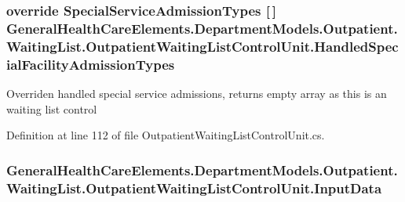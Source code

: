 \subsubsection[{\texorpdfstring{Handled\+Special\+Facility\+Admission\+Types}{HandledSpecialFacilityAdmissionTypes}}]{\setlength{\rightskip}{0pt plus 5cm}override {\bf Special\+Service\+Admission\+Types} \mbox{[}$\,$\mbox{]} General\+Health\+Care\+Elements.\+Department\+Models.\+Outpatient.\+Waiting\+List.\+Outpatient\+Waiting\+List\+Control\+Unit.\+Handled\+Special\+Facility\+Admission\+Types\hspace{0.3cm}{\ttfamily [get]}}\hypertarget{class_general_health_care_elements_1_1_department_models_1_1_outpatient_1_1_waiting_list_1_1_out0eb5e03b9183fdbdabb1cbe4530cecf4_a5f6e751d4a6b6ecb2c62f367be0c5e86}{}\label{class_general_health_care_elements_1_1_department_models_1_1_outpatient_1_1_waiting_list_1_1_out0eb5e03b9183fdbdabb1cbe4530cecf4_a5f6e751d4a6b6ecb2c62f367be0c5e86}


Overriden handled special service admissions, returns empty array as this is an waiting list control 



Definition at line 112 of file Outpatient\+Waiting\+List\+Control\+Unit.\+cs.

\subsubsection[{\texorpdfstring{Input\+Data}{InputData}}]{ General\+Health\+Care\+Elements.\+Department\+Models.\+Outpatient.\+Waiting\+List.\+Outpatient\+Waiting\+List\+Control\+Unit.\+Input\+Data\hspace{0.3cm}{\ttfamily [get]}}\hypertarget{class_general_health_care_elements_1_1_department_models_1_1_outpatient_1_1_waiting_list_1_1_out0eb5e03b9183fdbdabb1cbe4530cecf4_a070eecfc1d919b62fb8ad02bd18fb23c}{}\label{class_general_health_care_elements_1_1_department_models_1_1_outpatient_1_1_waiting_list_1_1_out0eb5e03b9183fdbdabb1cbe4530cecf4_a070eecfc1d919b62fb8ad02bd18fb23c}


